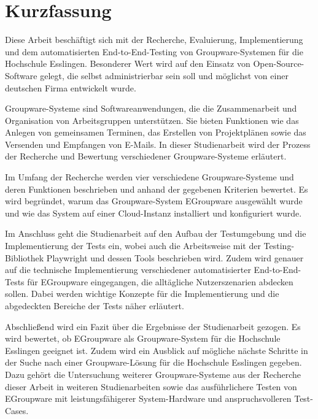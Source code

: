 \chapter{Kurzfassung}

Diese Arbeit beschäftigt sich mit der Recherche, Evaluierung, Implementierung und dem automatisierten End-to-End-Testing von Groupware-Systemen für die Hochschule Esslingen.
Besonderer Wert wird auf den Einsatz von Open-Source-Software gelegt, die selbst administrierbar sein soll und möglichst von einer deutschen Firma entwickelt wurde.

Groupware-Systeme sind Softwareanwendungen, die die Zusammenarbeit und Organisation von Arbeitsgruppen unterstützen.
Sie bieten Funktionen wie das Anlegen von gemeinsamen Terminen, das Erstellen von Projektplänen sowie das Versenden und Empfangen von E-Mails.
In dieser Studienarbeit wird der Prozess der Recherche und Bewertung verschiedener Groupware-Systeme erläutert.

Im Umfang der Recherche werden vier verschiedene Groupware-Systeme und deren Funktionen beschrieben und anhand der gegebenen Kriterien bewertet.
Es wird begründet, warum das Groupware-System EGroupware ausgewählt wurde und wie das System auf einer Cloud-Instanz installiert und konfiguriert wurde.

Im Anschluss geht die Studienarbeit auf den Aufbau der Testumgebung und die Implementierung der Tests ein, wobei auch die Arbeitsweise mit der Testing-Bibliothek Playwright und dessen Tools beschrieben wird.
Zudem wird genauer auf die technische Implementierung verschiedener automatisierter End-to-End-Tests für EGroupware eingegangen, die alltägliche Nutzerszenarien abdecken sollen.
Dabei werden wichtige Konzepte für die Implementierung und die abgedeckten Bereiche der Tests näher erläutert.

Abschließend wird ein Fazit über die Ergebnisse der Studienarbeit gezogen.
Es wird bewertet, ob EGroupware als Groupware-System für die Hochschule Esslingen geeignet ist.
Zudem wird ein Ausblick auf mögliche nächste Schritte in der Suche nach einer Groupware-Lösung für die Hochschule Esslingen gegeben.
Dazu gehört die Untersuchung weiterer Groupware-Systeme aus der Recherche dieser Arbeit in weiteren Studienarbeiten sowie das ausführlichere Testen von EGroupware mit leistungsfähigerer System-Hardware und anspruchsvolleren Test-Cases.